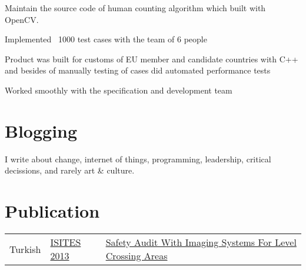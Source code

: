 \documentclass[]{deedy-resume-openfont}
\begin{document}
\begin{minipage}[t]{0.66\textwidth}
\href{http://kade.com.tr/}{}
\begin{tightemize}
\item Maintain the source code of human counting algorithm which built with OpenCV.
\end{tightemize}
\sectionsep

\href{http://www.accenture.com/lv-en/}{}
\begin{tightemize}
\item Implemented ~1000 test cases with the team of 6 people \\
\item Product was built for customs of EU member and candidate countries with C++ and besides of manually testing of cases did automated performance tests   \\
\item Worked smoothly with the specification and development team \\

\end{tightemize}
\sectionsep


\section{Blogging}
\href{http://metoinside.com/}{}

\begin{tightemize}
\item I write about change, internet of things, programming, leadership, critical decissions, and rarely art \& culture.
\end{tightemize}
\sectionsep


\section{Publication} 
\begin{tabular}{rll}
Turkish	     & \href{http://www.isites.info/PastConferences/ISITES2013/}{ISITES 2013}  & \href{http://www.isites.info/PastConferences/ISITES2013/}{Safety Audit With Imaging Systems For Level Crossing Areas}  \\


\end{tabular}
\end{minipage}
\end{document}
